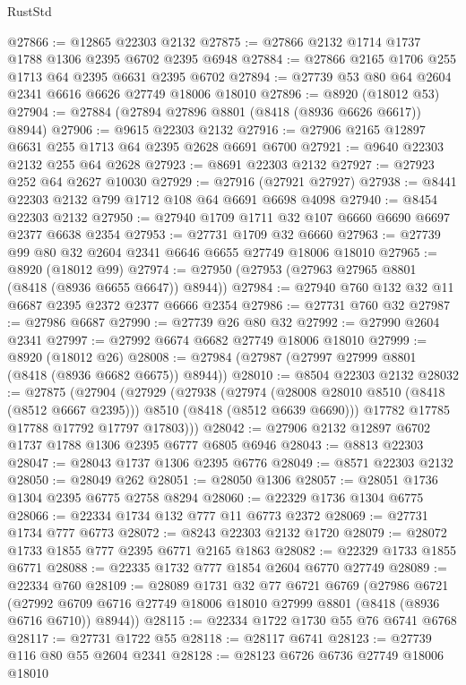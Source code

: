 \begin{lexlean}{RustStd}
\begin{coremodule}
@27866 := @12865 @22303 @2132
@27875 := @27866 @2132 @1714 @1737 @1788 @1306 @2395 @6702 @2395 @6948
@27884 := @27866 @2165 @1706 @255 @1713 @64 @2395 @6631 @2395 @6702
@27894 := @27739 @53 @80 @64 @2604 @2341 @6616 @6626 @27749 @18006 @18010
@27896 := @8920 (@18012 @53)
@27904 := @27884 (@27894 @27896 @8801 (@8418 (@8936 @6626 @6617)) @8944)
@27906 := @9615 @22303 @2132
@27916 := @27906 @2165 @12897 @6631 @255 @1713 @64 @2395 @2628 @6691 @6700
@27921 := @9640 @22303 @2132 @255 @64 @2628
@27923 := @8691 @22303 @2132
@27927 := @27923 @252 @64 @2627 @10030
@27929 := @27916 (@27921 @27927)
@27938 := @8441 @22303 @2132 @799 @1712 @108 @64 @6691 @6698 @4098
@27940 := @8454 @22303 @2132
@27950 := @27940 @1709 @1711 @32 @107 @6660 @6690 @6697 @2377 @6638 @2354
@27953 := @27731 @1709 @32 @6660
@27963 := @27739 @99 @80 @32 @2604 @2341 @6646 @6655 @27749 @18006 @18010
@27965 := @8920 (@18012 @99)
@27974 := @27950 (@27953 (@27963 @27965 @8801 (@8418 (@8936 @6655 @6647)) @8944))
@27984 := @27940 @760 @132 @32 @11 @6687 @2395 @2372 @2377 @6666 @2354
@27986 := @27731 @760 @32
@27987 := @27986 @6687
@27990 := @27739 @26 @80 @32
@27992 := @27990 @2604 @2341
@27997 := @27992 @6674 @6682 @27749 @18006 @18010
@27999 := @8920 (@18012 @26)
@28008 := @27984 (@27987 (@27997 @27999 @8801 (@8418 (@8936 @6682 @6675)) @8944))
@28010 := @8504 @22303 @2132
@28032 := @27875
    (@27904
      (@27929
        (@27938
          (@27974
            (@28008 @28010 @8510 (@8418 (@8512 @6667 @2395)))
            @8510
            (@8418 (@8512 @6639 @6690)))
          @17782
          @17785
          @17788
          @17792
          @17797
          @17803)))
@28042 := @27906 @2132 @12897 @6702 @1737 @1788 @1306 @2395 @6777 @6805 @6946
@28043 := @8813 @22303
@28047 := @28043 @1737 @1306 @2395 @6776
@28049 := @8571 @22303 @2132
@28050 := @28049 @262
@28051 := @28050 @1306
@28057 := @28051 @1736 @1304 @2395 @6775 @2758 @8294
@28060 := @22329 @1736 @1304 @6775
@28066 := @22334 @1734 @132 @777 @11 @6773 @2372
@28069 := @27731 @1734 @777 @6773
@28072 := @8243 @22303 @2132 @1720
@28079 := @28072 @1733 @1855 @777 @2395 @6771 @2165 @1863
@28082 := @22329 @1733 @1855 @6771
@28088 := @22335 @1732 @777 @1854 @2604 @6770 @27749
@28089 := @22334 @760
@28109 := @28089
    @1731
    @32
    @77
    @6721
    @6769
    (@27986
      @6721
      (@27992 @6709 @6716 @27749 @18006 @18010 @27999 @8801 (@8418 (@8936 @6716 @6710)) @8944))
@28115 := @22334 @1722 @1730 @55 @76 @6741 @6768
@28117 := @27731 @1722 @55
@28118 := @28117 @6741
@28123 := @27739 @116 @80 @55 @2604 @2341
@28128 := @28123 @6726 @6736 @27749 @18006 @18010

\end{coremodule}
\end{lexlean}

